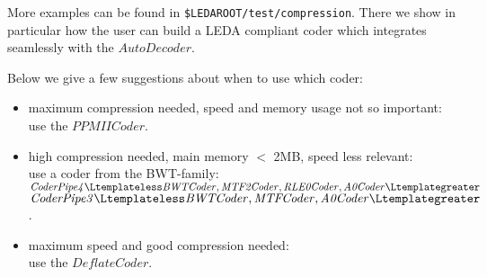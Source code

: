 More examples can be found in {\tt \$LEDAROOT/test/compression}. 
There we show in particular how the user can build a LEDA compliant 
coder which integrates seamlessly with the $\mathit{AutoDecoder}$.

\bigskip

Below we give a few suggestions about when to use which coder:
\begin{itemize}
\item maximum compression needed, speed and memory usage not so important:\\
use the $\mathit{PPMIICoder}$.
\item high compression needed, main memory $<$ 2MB, speed less relevant:\\
use a coder from the BWT-family:\\
$\mathit{CoderPipe4\Ltemplateless BWTCoder,MTF2Coder,RLE0Coder,A0Coder\Ltemplategreater}$
$\mathit{CoderPipe3\Ltemplateless BWTCoder,MTFCoder,A0Coder\Ltemplategreater}$.
\item maximum speed and good compression needed:\\
use the $\mathit{DeflateCoder}$.
\end{itemize}

\clearpage


\newpage

\newpage

\newpage

\newpage

\newpage

\newpage


\newpage

\newpage

\newpage

\newpage


\newpage


\newpage

\newpage

\newpage

\newpage
